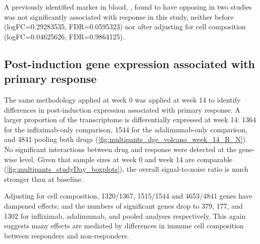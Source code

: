 A previously identified marker in blood, , found to have opposing in two studies \autocite{gaujoux2019CellcentredMetaanalysisReveals,verstockt2019LowTREM1Expression}
was not significantly associated with response in this study, 
neither before (logFC=\num{0.29283535}, FDR=\num{0.0595323})
nor after adjusting for cell composition (logFC=\num{0.04625626}, FDR=\num{0.9864125}).




\subsection{Post-induction gene expression associated with primary response}

The same methodology applied at week 0 was applied at week 14 to identify differences in post-induction expression associated with primary response.
A larger proportion of the transcriptome is differentially expressed at week 14: 
1364 for the infliximab-only comparison, 
1544 for the adalimumab-only comparison, 
and 4841 pooling both drugs (\autoref{fig:multipants_dge_volcano_week_14_R_N}).
No significant interactions between drug and response were detected at the gene-wise level.
Given that sample sizes at week 0 and week 14 are comparable (\autoref{fig:multipants_studyDay_boxplots}), the overall signal-to-noise ratio is much stronger than at baseline.

Adjusting for cell composition, 1320/1367, 1515/1544 and 4653/4841 genes have dampened effects;
and the numbers of significant genes drop to 379, 177, and 1302 for infliximab, adalimumab, and pooled analyses respectively.
This again suggests many effects are mediated by differences in immune cell composition between responders and non-responders.

